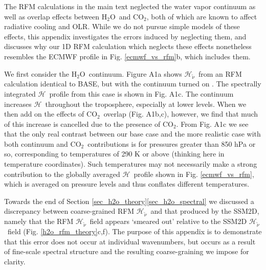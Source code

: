 \documentclass{ametsoc}
\newcommand{\cotwo}{\ensuremath{\mathrm{CO_2}}}
\newcommand{\htwo}{\ensuremath{\mathrm{H_2O}}}
\newcommand{\wv}{\ensuremath{\widetilde{\nu}}}
\newcommand{\ch}{\ensuremath{\mathcal{H}}}
\newcommand{\chk}{\ensuremath{\ch_{\wv}}}
\begin{document}
%


\appendix[A] \label{sec_cont_co2}
\appendixtitle{Sensitivity to \htwo\ continuum and \cotwo\ overlap} 
The RFM  calculations in the main text  neglected the water vapor continuum as well as overlap effects between \htwo\ and \cotwo, both of which are known to affect radiative cooling and OLR. While we do not pursue simple models of these effects, this appendix investigates the errors induced by neglecting them, and discusses why our 1D RFM calculation which neglects these effects nonetheless resembles the ECMWF profile in Fig. \ref{ecmwf_vs_rfm}b, which includes them.

We first consider the \htwo\ continuum. Figure A1a shows \chk\ from an RFM calculation identical to BASE, but with the continuum turned on \citep[RFM uses the MT\_CKD continuum,][]{mlawer2012}. The spectrally integrated \ch\ profile from this case is shown in Fig. A1c. The continuum increases \ch\ throughout the troposphere, especially at lower levels. When we then add on the effects of \cotwo\ overlap (Fig. A1b,c), however, we find that much of this increase is cancelled due to the presence of \cotwo. From Fig. A1c we see that  the only real contrast between our base case and the more realistic case with both continuum and \cotwo\ contributions is for pressures greater than  850 hPa or so, corresponding to temperatures of 290 K or above (thinking here in temperature coordinates). Such temperatures  may not necessarily make a strong contribution to the globally averaged \ch\ profile shown in Fig. \ref{ecmwf_vs_rfm}, which is averaged on pressure levels and thus conflates different temperatures.

\appendix[B] \label{appendix_SSM2D_valid}
Towards the end of Section \ref{sec_h2o_theory}\ref{sec_h2o_spectral} we discussed a discrepancy between coarse-grained RFM \chk\ and that produced by the SSM2D, namely that the RFM \chk\ field appears `smeared out' relative to the SSM2D \chk\ field (Fig. \ref{h2o_rfm_theory}c,f). The purpose of this appendix is to demonstrate that this error does not occur at individual wavenumbers, but occurs as a result of fine-scale spectral structure and the resulting coarse-graining we impose for clarity.
\end{document}
